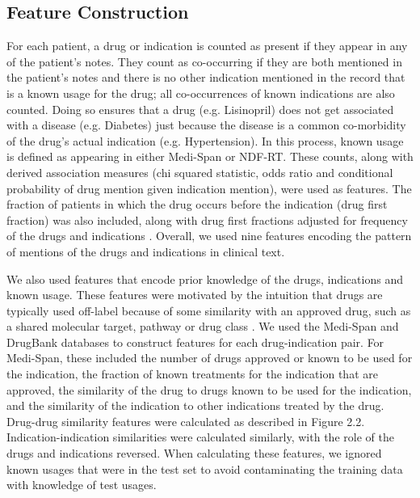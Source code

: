 \subsection{Feature Construction}
For each patient, a drug or indication is counted as present if they
appear in any of the patient’s notes.  They count as co-occurring if
they are both mentioned in the patient’s notes and there is no other
indication mentioned in the record that is a known usage for the drug;
all co-occurrences of known indications are also counted.  Doing so
ensures that a drug (e.g. Lisinopril) does not get associated with a
disease (e.g. Diabetes) just because the disease is a common
co-morbidity of the drug’s actual indication (e.g. Hypertension).  In
this process, known usage is defined as appearing in either Medi-Span
or NDF-RT. These counts, along with derived association measures (chi
squared statistic, odds ratio and conditional probability of drug
mention given indication mention), were used as features. The fraction
of patients in which the drug occurs before the indication (drug first
fraction) was also included, along with drug first fractions adjusted
for frequency of the drugs and indications \cite{Liu2012}. Overall, we
used nine features encoding the pattern of mentions of the drugs and
indications in clinical text.

We also used features that encode prior knowledge of the drugs,
indications and known usage.  These features were motivated by the
intuition that drugs are typically used off-label because of some
similarity with an approved drug, such as a shared molecular target,
pathway or drug class \cite{Epstein2012}.  We used the Medi-Span and
DrugBank databases to construct features for each drug-indication
pair.  For Medi-Span, these included the number of drugs approved or
known to be used for the indication, the fraction of known treatments
for the indication that are approved, the similarity of the drug to
drugs known to be used for the indication, and the similarity of the
indication to other indications treated by the drug. Drug-drug
similarity features were calculated as described in Figure 2.2.
Indication-indication similarities were calculated similarly, with the
role of the drugs and indications reversed.  When calculating these
features, we ignored known usages that were in the test set to avoid
contaminating the training data with knowledge of test usages.

